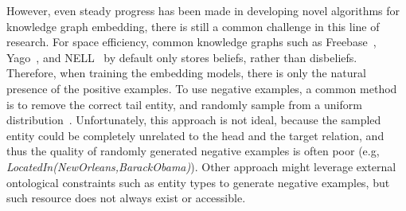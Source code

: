 \documentclass[11pt,a4paper]{article}
\begin{document}
However, even steady progress has been made in developing novel algorithms for knowledge graph embedding, there is still a common challenge in this line of research. For space efficiency, common knowledge graphs such as Freebase~\cite{bollacker2008freebase}, Yago~\cite{suchanek2007yago}, and NELL~\cite{mitchell2015never} by default only stores beliefs, rather than disbeliefs. Therefore, when training the embedding models, there is only the natural presence of the positive examples. To use negative examples, a common method is to remove the correct tail entity, and randomly sample from a uniform distribution~\cite{bordes2013translating}. Unfortunately, this approach is not ideal, because the sampled entity could be completely unrelated to the head and the target relation, and thus the quality of randomly generated negative examples is often poor (e.g, \emph{LocatedIn(NewOrleans,BarackObama)}). Other approach might leverage external ontological constraints such as entity types \cite{krompass2015type} to generate negative examples, but such resource does not always exist or accessible.
\end{document}
